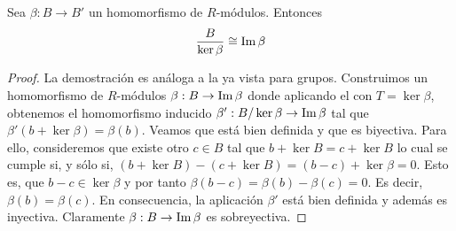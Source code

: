 %
%
%
\begin{teorema}
	 \label{teo:first-iso} Sea \(\beta : B \to B'\) un homomorfismo
	de \(R\)-módulos. Entonces
	\[
		\frac{B}{\ker \beta}\cong \operatorname{Im} \beta
	\]
\end{teorema}
\begin{proof}
	La demostración es análoga a la ya vista para grupos. Construimos un
	homomorfismo de \(R\)-módulos \(\beta: B \to \operatorname{Im} \beta\) donde aplicando el
	 con \(T = \ker \beta\), obtenemos el homomorfismo
	inducido \(\beta' : B/\ker \beta \to \operatorname{Im} \beta\) tal que
	\(\beta'(b+\ker \beta) = \beta(b)\). Veamos que está bien definida y que es biyectiva.
	Para ello, consideremos que existe otro \(c \in B\) tal que \(b + \ker B = c + \ker
	B\) lo cual se cumple si, y sólo si, \((b + \ker B) - (c + \ker B) = (b - c) + \ker
	\beta = 0\). Esto es, que \(b - c \in \ker \beta\) y por tanto \(\beta(b-c) = \beta
	(b) - \beta(c) = 0\). Es decir, \(\beta(b) = \beta(c)\). En consecuencia, la aplicación
	\(\beta'\) está bien definida y además es inyectiva. Claramente
	\(\beta: B \to \operatorname{Im} \beta\) es sobreyectiva.
\end{proof}
